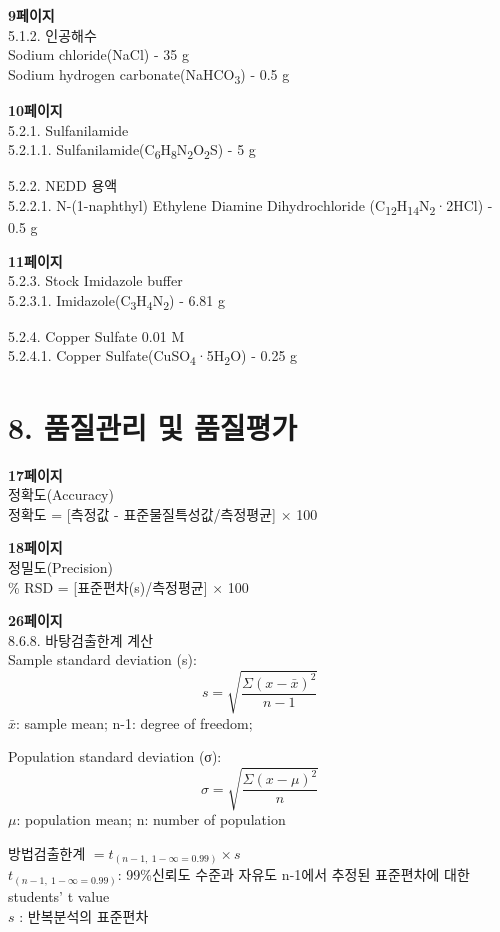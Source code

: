 \documentclass[
]{book}
\begin{document}
\textbf{9페이지}\\
5.1.2. 인공해수\\
Sodium chloride(NaCl) - 35 g\\
Sodium hydrogen carbonate(NaHCO\textsubscript{3}) - 0.5 g

\textbf{10페이지}\\
5.2.1. Sulfanilamide\\
5.2.1.1. Sulfanilamide(C\textsubscript{6}H\textsubscript{8}N\textsubscript{2}O\textsubscript{2}S) - 5 g

5.2.2. NEDD 용액\\
5.2.2.1. N-(1-naphthyl) Ethylene Diamine Dihydrochloride (C\textsubscript{12}H\textsubscript{14}N\textsubscript{2}·2HCl) - 0.5 g

\textbf{11페이지}\\
5.2.3. Stock Imidazole buffer\\
5.2.3.1. Imidazole(C\textsubscript{3}H\textsubscript{4}N\textsubscript{2}) - 6.81 g

5.2.4. Copper Sulfate 0.01 M\\
5.2.4.1. Copper Sulfate(CuSO\textsubscript{4}·5H\textsubscript{2}O) - 0.25 g

\hypertarget{uxd488uxc9c8uxad00uxb9ac-uxbc0f-uxd488uxc9c8uxd3c9uxac00}{%
\section{8. 품질관리 및 품질평가}\label{uxd488uxc9c8uxad00uxb9ac-uxbc0f-uxd488uxc9c8uxd3c9uxac00}}

\textbf{17페이지}\\
정확도(Accuracy)\\
정확도 = {[}측정값 - 표준물질특성값/측정평균{]} × 100

\textbf{18페이지}\\
정밀도(Precision)\\
\% RSD = {[}표준편차(s)/측정평균{]} × 100

\textbf{26페이지}\\
8.6.8. 바탕검출한계 계산\\
Sample standard deviation (s):\\
\[
s=\sqrt{\frac {\Sigma {(x- \bar x)}^{2}} {n-1}}
\]
\(\bar x\): sample mean; n-1: degree of freedom;

Population standard deviation (σ):
\[
\sigma=\sqrt{\frac {\Sigma {(x- \mu)}^{2}} {n}}
\]
\(\mu\): population mean; n: number of population

방법검출한계 \(={t_{(n-1, ~1-\infty=0.99)}\times s}\)\\
\(t_{(n-1, ~1-\infty=0.99)}\): 99\%신뢰도 수준과 자유도 n-1에서 추정된 표준편차에 대한 students' t value\\
\(s\) : 반복분석의 표준편차
\end{document}
